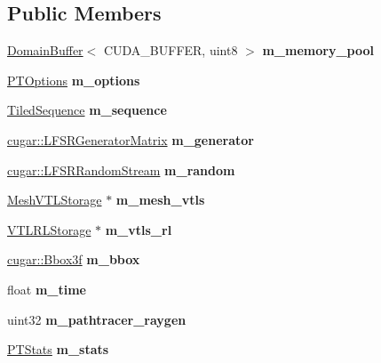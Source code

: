 \subsection*{Public Members}
\begin{DoxyCompactItemize}
\item 
\mbox{\label{struct_path_tracer_ab4e4e4cad2b4b894c8f117dac5a809b7}} 
\hyperlink{class_domain_buffer}{Domain\+Buffer}$<$ C\+U\+D\+A\+\_\+\+B\+U\+F\+F\+ER, uint8 $>$ {\bfseries m\+\_\+memory\+\_\+pool}
\item 
\mbox{\label{struct_path_tracer_a4e4eedcd2f916a248f87f2ba240a2e16}} 
\hyperlink{struct_p_t_options}{P\+T\+Options} {\bfseries m\+\_\+options}
\item 
\mbox{\label{struct_path_tracer_a6fd9814f780b9773cf09ffeb7b0f113e}} 
\hyperlink{struct_tiled_sequence}{Tiled\+Sequence} {\bfseries m\+\_\+sequence}
\item 
\mbox{\label{struct_path_tracer_a57eb13d57e9081b3831e3933c2c924f9}} 
\hyperlink{classcugar_1_1_l_f_s_r_generator_matrix}{cugar\+::\+L\+F\+S\+R\+Generator\+Matrix} {\bfseries m\+\_\+generator}
\item 
\mbox{\label{struct_path_tracer_abaed20bfd304377069f9c5f8b740a175}} 
\hyperlink{structcugar_1_1_l_f_s_r_random_stream}{cugar\+::\+L\+F\+S\+R\+Random\+Stream} {\bfseries m\+\_\+random}
\item 
\mbox{\label{struct_path_tracer_a1dc439c9f458b3fee5e07edfb1bc1a12}} 
\hyperlink{struct_mesh_v_t_l_storage}{Mesh\+V\+T\+L\+Storage} $\ast$ {\bfseries m\+\_\+mesh\+\_\+vtls}
\item 
\mbox{\label{struct_path_tracer_af1f0df6e130041e52ae03411ef0b85a2}} 
\hyperlink{struct_adaptive_clustered_r_l_storage}{V\+T\+L\+R\+L\+Storage} $\ast$ {\bfseries m\+\_\+vtls\+\_\+rl}
\item 
\mbox{\label{struct_path_tracer_a34ee633b20d75d2f00d36c8c0cbee2eb}} 
\hyperlink{structcugar_1_1_bbox}{cugar\+::\+Bbox3f} {\bfseries m\+\_\+bbox}
\item 
\mbox{\label{struct_path_tracer_a08787bb830c6a9f883ce428fc3fb80af}} 
float {\bfseries m\+\_\+time}
\item 
\mbox{\label{struct_path_tracer_a7561a9680a0b3435e89b218a9b369694}} 
uint32 {\bfseries m\+\_\+pathtracer\+\_\+raygen}
\item 
\mbox{\label{struct_path_tracer_a354c091ed28190973b8f589ab5867b60}} 
\hyperlink{struct_p_t_stats}{P\+T\+Stats} {\bfseries m\+\_\+stats}
\end{DoxyCompactItemize}


